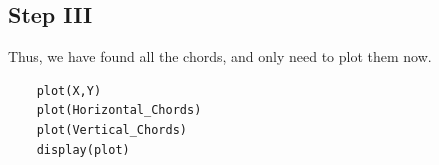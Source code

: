 \subsection{Step III}

Thus, we have found all the chords, and only need to plot them now.

\begin{lstlisting}
    plot(X,Y)
    plot(Horizontal_Chords)
    plot(Vertical_Chords)
    display(plot)
\end{lstlisting}

\begin{figure}[h]
  \centering
\end{figure}

